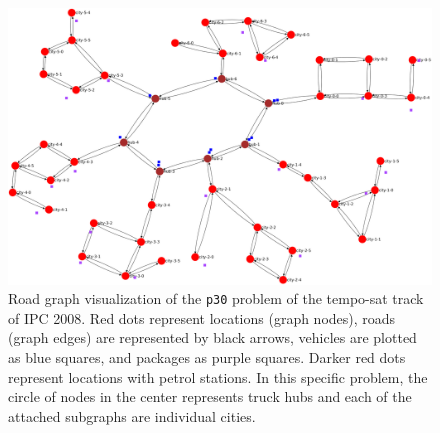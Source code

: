 \begin{figure}[tb]
\begin{center}
\includegraphics[width=1.0\textwidth]{../img/ipc08_tempo-sat_p30_land}
\end{center}
\caption[Visualization of the \texttt{p30} problem of temporal Transport from IPC 2008.]{Road graph visualization of the \texttt{p30} problem of the tempo-sat track of IPC 2008. Red dots represent locations (graph nodes), roads (graph edges) are represented by black arrows, vehicles are plotted as blue squares, and packages as purple squares. Darker red dots represent locations with petrol stations. In this specific problem, the circle of nodes in the center represents truck hubs and each of the attached subgraphs are individual cities.}
\label{fig:ipc08_tempo-sat_p30}
\end{figure}

